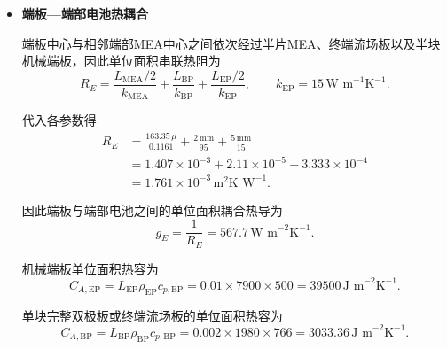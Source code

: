 \documentclass[bwprint]{gmcmthesis}
\numberwithin{figure}{section}
\begin{document}
\begin{itemize}
\noindent 可以看出，片间总热阻主要由MEA贡献，其中高孔隙率的阴极GDL由于气相导热系数较低，对贯穿热阻贡献较大。随着启动过程中液态水和冰相发生变化，各功能层导热系数亦会随之改变，因此正式计算中片间热导并不固定，而按照各片实时水冰状态更新为
\begin{equation}
g_{k,k+1}(t) = \left[ \frac{1}{2} R_{\text{MEA},k}(t) + \frac{L_{\text{BP}}}{k_{\text{BP}}} + \frac{1}{2} R_{\text{MEA},k+1}(t) \right]^{-1}. \tag{5-14}
\end{equation}

\noindent 这样既保留了问题一含水、含冰状态对材料热物性的动态影响，也保证同一片间边的传热功率在相邻两节点之间等量反向出现。


\item \textbf {端板—端部电池热耦合}

\noindent 端板中心与相邻端部MEA中心之间依次经过半片MEA、终端流场板以及半块机械端板，因此单位面积串联热阻为
\begin{equation}
R_E = \frac{L_{\text{MEA}}/2}{k_{\text{MEA}}} + \frac{L_{\text{BP}}}{k_{\text{BP}}} + \frac{L_{\text{EP}}/2}{k_{\text{EP}}}, \qquad k_{\text{EP}} = 15 \, \text{W m}^{-1}\text{K}^{-1}. \tag{5-15}
\end{equation}

\noindent 代入各参数得
\begin{align}
R_E &= \frac{163.35 \, \mu}{0.1161} + \frac{2 \, \text{mm}}{95} + \frac{5 \, \text{mm}}{15} \nonumber \\
    &= 1.407 \times 10^{-3} + 2.11 \times 10^{-5} + 3.333 \times 10^{-4} \nonumber \\
    &= 1.761 \times 10^{-3} \, \text{m}^2\text{K W}^{-1}. \tag{5-16}
\end{align}

\noindent 因此端板与端部电池之间的单位面积耦合热导为
\begin{equation}
g_E = \frac{1}{R_E} = 567.7 \, \text{W m}^{-2}\text{K}^{-1}. \tag{5-17}
\end{equation}

\noindent 机械端板单位面积热容为
\begin{equation}
C_{A,\text{EP}} = L_{\text{EP}} \rho_{\text{EP}} c_{p,\text{EP}} = 0.01 \times 7900 \times 500 = 39500 \, \text{J m}^{-2}\text{K}^{-1}. \tag{5-18}
\end{equation}

\noindent 单块完整双极板或终端流场板的单位面积热容为
\begin{equation}
C_{A,\text{BP}} = L_{\text{BP}} \rho_{\text{BP}} c_{p,\text{BP}} = 0.002 \times 1980 \times 766 = 3033.36 \, \text{J m}^{-2}\text{K}^{-1}. \tag{5-19}
\end{equation}


\end{itemize}
\end{document}
